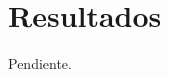 \documentclass[a4paper,10pt,twoside]{article}
\begin{document}











\section{Resultados}
Pendiente.

\end{document}
